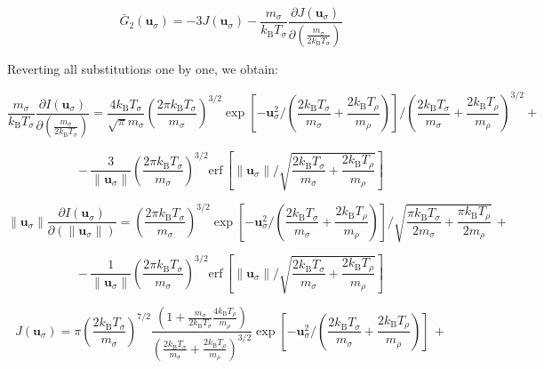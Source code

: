\begin{equation}
    \bar{G}_2(\mathbf{u}_\sigma)=-3J(\mathbf{u}_\sigma)-\frac{m_\sigma}{k_\mathrm{B}T_\sigma}\frac{\partial J(\mathbf{u}_\sigma)}{\partial\left(\frac{m_\sigma}{2k_\mathrm{B}T_\sigma}\right)}
\end{equation}

Reverting all substitutions one by one, we obtain:

\begin{equation*}
    \frac{m_\sigma}{k_\mathrm{B}T_\sigma}\frac{\partial I(\mathbf{u}_\sigma)}{\partial\left(\frac{m_\sigma}{2k_\mathrm{B}T_\sigma}\right)}=\frac{4k_\mathrm{B}T_\sigma}{\sqrt{\pi}m_\sigma}\left(\frac{2\pi k_\mathrm{B}T_\sigma}{m_\sigma}\right)^{3/2}\exp{\left[-\mathbf{u}_\sigma^2\bigg/\left(\frac{2k_\mathrm{B}T_\sigma}{m_\sigma}+\frac{2k_\mathrm{B}T_\rho}{m_\rho}\right)\right]}\bigg/\left(\frac{2k_\mathrm{B}T_\sigma}{m_\sigma}+\frac{2k_\mathrm{B}T_\rho}{m_\rho}\right)^{3/2}+
\end{equation*}

\begin{equation}
    -\,\frac{3}{\|\mathbf{u}_\sigma\|}\left(\frac{2\pi k_\mathrm{B}T_\sigma}{m_\sigma}\right)^{3/2}\text{erf}\,\left[\|\mathbf{u}_\sigma\|\bigg/\sqrt{\frac{2k_\mathrm{B}T_\sigma}{m_\sigma}+\frac{2k_\mathrm{B}T_\rho}{m_\rho}}\right]
\end{equation}

\begin{equation*}
    \|\mathbf{u}_\sigma\|\frac{\partial I(\mathbf{u}_\sigma)}{\partial(\|\mathbf{u}_\sigma\|)}=\left(\frac{2\pi k_\mathrm{B}T_\sigma}{m_\sigma}\right)^{3/2}\exp{\left[-\mathbf{u}_\sigma^2\bigg/\left(\frac{2k_\mathrm{B}T_\sigma}{m_\sigma}+\frac{2k_\mathrm{B}T_\rho}{m_\rho}\right)\right]}\bigg/\sqrt{\frac{\pi k_\mathrm{B}T_\sigma}{2m_\sigma}+\frac{\pi k_\mathrm{B}T_\rho}{2m_\rho}}\,+
\end{equation*}

\begin{equation}
    -\,\frac{1}{\|\mathbf{u}_\sigma\|}\left(\frac{2\pi k_\mathrm{B}T_\sigma}{m_\sigma}\right)^{3/2}\text{erf}\,{\left[\|\mathbf{u}_\sigma\|\bigg/\sqrt{\frac{2k_\mathrm{B}T_\sigma}{m_\sigma}+\frac{2k_\mathrm{B}T_\rho}{m_\rho}}\right]}
\end{equation}

\begin{equation*}
    J(\mathbf{u}_\sigma)=\pi\left(\frac{2k_\mathrm{B}T_\sigma}{m_\sigma}\right)^{7/2}\frac{\left(1+\frac{m_\sigma}{2k_\mathrm{B}T_\sigma}\frac{4k_\mathrm{B}T_\rho}{m_\rho}\right)}{\left(\frac{2k_\mathrm{B}T_\sigma}{m_\sigma}+\frac{2k_\mathrm{B}T_\rho}{m_\rho}\right)^{3/2}}\exp{\left[-\mathbf{u}_\sigma^2\bigg/\left(\frac{2k_\mathrm{B}T_\sigma}{m_\sigma}+\frac{2k_\mathrm{B}T_\rho}{m_\rho}\right)\right]}\,+
\end{equation*}

